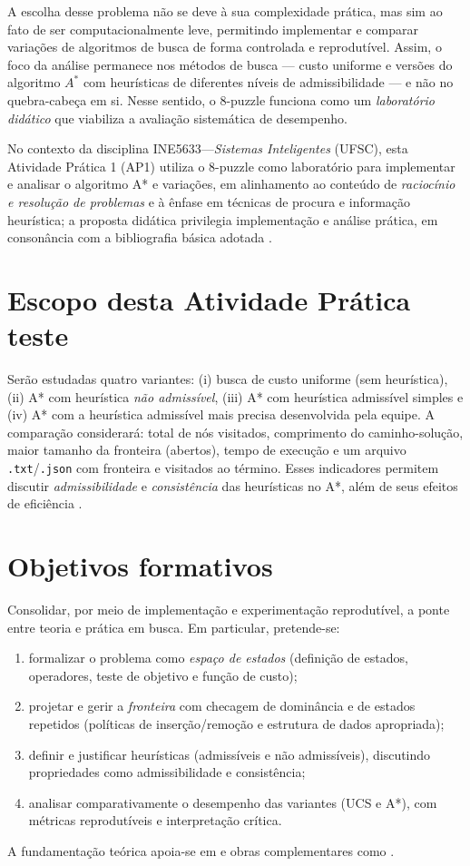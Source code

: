 A escolha desse problema não se deve à sua complexidade prática, mas sim ao fato de ser 
computacionalmente leve, permitindo implementar e comparar variações de algoritmos de busca de forma controlada e 
reprodutível. Assim, o foco da análise permanece nos métodos de busca --- custo uniforme e versões do algoritmo $A^*$ 
com heurísticas de diferentes níveis de admissibilidade --- e não no quebra-cabeça em si. Nesse sentido, o 8-puzzle 
funciona como um \emph{laboratório didático} que viabiliza a avaliação sistemática de desempenho.

No contexto da disciplina INE5633---\emph{Sistemas Inteligentes} (UFSC), esta Atividade Prática 1 (AP1) utiliza o 8-puzzle como laboratório para implementar e analisar o algoritmo A* e variações, em alinhamento ao conteúdo de \emph{raciocínio e resolução de problemas} e à ênfase em técnicas de procura e informação heurística; a proposta didática privilegia implementação e análise prática, em consonância com a bibliografia básica adotada \cite{russell2010artificial,luger2009artificial}.

\section{Escopo desta Atividade Prática teste}
Serão estudadas quatro variantes: (i) busca de custo uniforme (sem heurística), (ii) A* com heurística \emph{não admissível}, (iii) A* com heurística admissível simples e (iv) A* com a heurística admissível mais precisa desenvolvida pela equipe. A comparação considerará: total de nós visitados, comprimento do caminho-solução, maior tamanho da fronteira (abertos), tempo de execução e um arquivo \texttt{.txt}/\texttt{.json} com fronteira e visitados ao término. Esses indicadores permitem discutir \emph{admissibilidade} e \emph{consistência} das heurísticas no A*, além de seus efeitos de eficiência \cite{russell2010artificial,luger2009artificial}.

\section{Objetivos formativos}
Consolidar, por meio de implementação e experimentação reprodutível, a ponte entre teoria e prática em busca. Em particular, pretende-se:
\begin{enumerate}[label=(\alph*),leftmargin=*,itemsep=0pt,topsep=2pt]
  \item formalizar o problema como \emph{espaço de estados} (definição de estados, operadores, teste de objetivo e função de custo);
  \item projetar e gerir a \emph{fronteira} com checagem de dominância e de estados repetidos (políticas de inserção/remoção e estrutura de dados apropriada);
  \item definir e justificar heurísticas (admissíveis e não admissíveis), discutindo propriedades como admissibilidade e consistência;
  \item analisar comparativamente o desempenho das variantes (UCS e A*), com métricas reprodutíveis e interpretação crítica.
\end{enumerate}
A fundamentação teórica apoia-se em  e obras complementares como .


